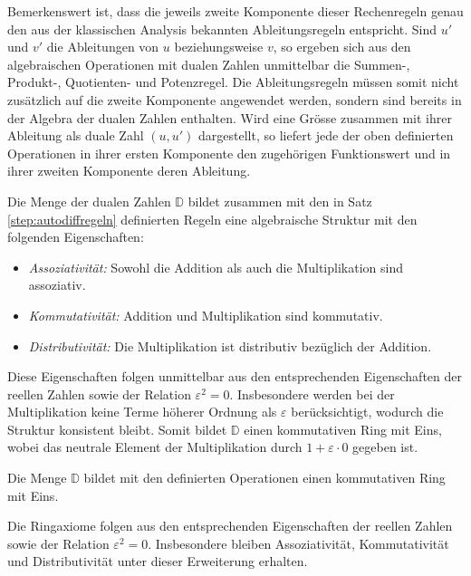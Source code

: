 Bemerkenswert ist, dass die jeweils zweite Komponente dieser Rechenregeln genau den aus der klassischen Analysis bekannten Ableitungsregeln entspricht.
Sind $u'$ und $v'$ die Ableitungen von $u$ beziehungsweise $v$, so ergeben sich aus den algebraischen Operationen mit dualen Zahlen unmittelbar die Summen-, Produkt-, Quotienten- und Potenzregel.
Die Ableitungsregeln müssen somit nicht zusätzlich auf die zweite Komponente angewendet werden, sondern sind bereits in der Algebra der dualen Zahlen enthalten.
Wird eine Grösse zusammen mit ihrer Ableitung als duale Zahl $(u,u')$ dargestellt, so liefert jede der oben definierten Operationen in ihrer ersten Komponente den zugehörigen Funktionswert und in ihrer zweiten Komponente deren Ableitung.

Die Menge der dualen Zahlen $\mathbb{D}$ bildet zusammen mit den in Satz \ref{step:autodiffregeln} definierten Regeln eine algebraische Struktur mit den folgenden Eigenschaften:
\begin{itemize}
	\item \emph{Assoziativität:} Sowohl die Addition als auch die Multiplikation sind assoziativ.
	\item \emph{Kommutativität:} Addition und Multiplikation sind kommutativ.
	\item \emph{Distributivität:} Die Multiplikation ist distributiv bezüglich der Addition.
\end{itemize}
Diese Eigenschaften folgen unmittelbar aus den entsprechenden Eigenschaften der reellen Zahlen sowie der Relation $\varepsilon^2 = 0$. Insbesondere werden bei der Multiplikation keine Terme höherer Ordnung als $\varepsilon$ berücksichtigt, wodurch die Struktur konsistent bleibt.
Somit bildet $\mathbb{D}$ einen kommutativen Ring mit Eins, wobei das neutrale Element der Multiplikation durch $1 + \varepsilon \cdot 0$ gegeben ist.


\begin{satz}
	Die Menge $\mathbb{D}$ bildet mit den definierten Operationen einen kommutativen Ring mit Eins.
\end{satz}
%
Die Ringaxiome folgen aus den entsprechenden Eigenschaften der reellen Zahlen sowie der Relation $\varepsilon^2 = 0$. Insbesondere bleiben Assoziativität, Kommutativität und Distributivität unter dieser Erweiterung erhalten.
%
%
%


